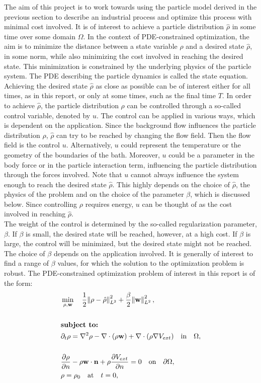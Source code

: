 The aim of this project is to work towards using the particle model derived in the previous section to describe an industrial process and optimize this process with minimal cost involved.
It is of interest to achieve a particle distribution $\hat{\rho}$ in some time over some domain $\Omega$.  
In the context of PDE-constrained optimization, the aim is to minimize the distance between a state variable $\rho$ and a desired state $\hat\rho$, in some norm, while also minimizing the cost involved in reaching the desired state. This minimization is constrained by the underlying physics of the particle system. The PDE describing the particle dynamics is called the state equation.
\newline
Achieving the desired state $\hat\rho$ as close as possible can be of interest either for all times, as in this report, or only at some times, such as the final time $T$. In order to achieve $\hat \rho$, the particle distribution $\rho$ can be controlled through a so-called control variable, denoted by $u$. The control can be applied in various ways, which is dependent on the application. Since the background flow influences the particle distribution $\rho$, $\hat\rho$ can try to be reached by changing the flow field. Then the flow field is the control $u$. Alternatively, $u$ could represent the temperature or the geometry of the boundaries of the bath. Moreover, $u$ could be a parameter in the body force or in the particle interaction term, influencing the particle distribution through the forces involved. Note that $u$ cannot always influence the system enough to reach the desired state $\hat \rho$. This highly depends on the choice of $\hat \rho$, the physics of the problem and on the choice of the parameter $\beta$, which is discussed below.
Since controlling $\rho$ requires energy, $u$ can be thought of as the cost involved in reaching $\hat\rho$. 
\\ 
The weight of the control is determined by the so-called regularization parameter, $\beta$. If $\beta$ is small, the desired state will be reached, however, at a high cost. If $\beta$ is large, the control will be minimized, but the desired state might not be reached. The choice of $\beta$ depends on the application involved. It is generally of interest to find a range of $\beta$ values, for which the solution to the optimization problem is robust. 
The PDE-constrained optimization problem of interest in this report is of the form:
\begin{align} \label{sysPDEconOpti1}
&\min_{\rho,\mathbf{w}} \quad \frac{1}{2}\norm{\rho- \hat{\rho}}_{L^2}^2 + \frac{\beta}{2} \norm{\mathbf{w}}_{L^2}^2,\\
\notag\\
&\textbf{subject to:}\notag\\ 
&\partial_t \rho =\nabla^2 \rho - \nabla \cdot (\rho \mathbf{w}) + \nabla \cdot (\rho \nabla V_{ext}) \quad \text{in} \quad \Omega,\notag\\
\notag\\
&\dfrac{\partial \rho}{\partial {n}} - \rho \mathbf{w} \cdot \mathbf{n} + \rho \dfrac{\partial V_{ext}}{\partial {n}}  =0 \quad \text{on} \quad \partial \Omega,\notag \\
& \rho = \rho_0 \quad \text{at} \quad t=0,  \notag
\end{align}
